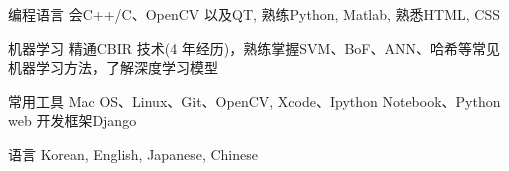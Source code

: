 

\begin{cvskills}

  \cvskill
    {编程语言} %
    {会C++/C、OpenCV 以及QT, 熟练Python, Matlab, 熟悉HTML, CSS} %

  \cvskill
    {机器学习} %
    {精通CBIR 技术(4 年经历)，熟练掌握SVM、BoF、ANN、哈希等常见机器学习方法，了解深度学习模型} %

  \cvskill
    {常用工具} %
    {Mac OS、Linux、Git、OpenCV, Xcode、Ipython Notebook、Python web 开发框架Django} %

  \cvskill
    {语言} %
    {Korean, English, Japanese, Chinese} %

\end{cvskills}
